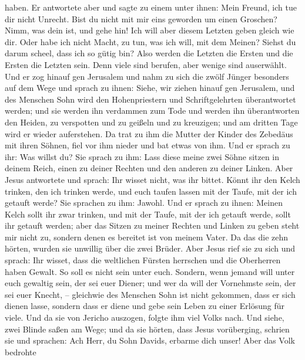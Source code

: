 haben.  Er antwortete aber und sagte zu einem unter ihnen:
Mein Freund, ich tue dir nicht Unrecht. Bist du nicht mit mir eins
geworden um einen Groschen?  Nimm, was dein ist, und gehe
hin! Ich will aber diesem Letzten geben gleich wie dir. 
Oder habe ich nicht Macht, zu tun, was ich will, mit dem Meinen? Siehst
du darum scheel, dass ich so gütig bin?  Also werden die
Letzten die Ersten und die Ersten die Letzten sein. Denn viele sind
berufen, aber wenige sind auserwählt.  Und er zog hinauf
gen Jerusalem und nahm zu sich die zwölf Jünger besonders auf dem Wege
und sprach zu ihnen:  Siehe, wir ziehen hinauf gen
Jerusalem, und des Menschen Sohn wird den Hohenpriestern und
Schriftgelehrten überantwortet werden; und sie werden ihn verdammen zum
Tode  und werden ihn überantworten den Heiden, zu
verspotten und zu geißeln und zu kreuzigen; und am dritten Tage wird er
wieder auferstehen.  Da trat zu ihm die Mutter der Kinder
des Zebedäus mit ihren Söhnen, fiel vor ihm nieder und bat etwas von
ihm.  Und er sprach zu ihr: Was willst du? Sie sprach zu
ihm: Lass diese meine zwei Söhne sitzen in deinem Reich, einen zu deiner
Rechten und den anderen zu deiner Linken.  Aber Jesus
antwortete und sprach: Ihr wisset nicht, was ihr bittet. Könnt ihr den
Kelch trinken, den ich trinken werde, und euch taufen lassen mit der
Taufe, mit der ich getauft werde? Sie sprachen zu ihm: Jawohl.
 Und er sprach zu ihnen: Meinen Kelch sollt ihr zwar
trinken, und mit der Taufe, mit der ich getauft werde, sollt ihr getauft
werden; aber das Sitzen zu meiner Rechten und Linken zu geben steht mir
nicht zu, sondern denen es bereitet ist von meinem Vater. 
Da das die zehn hörten, wurden sie unwillig über die zwei Brüder.
 Aber Jesus rief sie zu sich und sprach: Ihr wisset, dass
die weltlichen Fürsten herrschen und die Oberherren haben Gewalt.
 So soll es nicht sein unter euch. Sondern, wenn jemand
will unter euch gewaltig sein, der sei euer Diener;  und
wer da will der Vornehmste sein, der sei euer Knecht, -- 
gleichwie des Menschen Sohn ist nicht gekommen, dass er sich dienen
lasse, sondern dass er diene und gebe sein Leben zu einer Erlösung für
viele.  Und da sie von Jericho auszogen, folgte ihm viel
Volks nach.  Und siehe, zwei Blinde saßen am Wege; und da
sie hörten, dass Jesus vorüberging, schrien sie und sprachen: Ach Herr,
du Sohn Davids, erbarme dich unser!  Aber das Volk bedrohte
